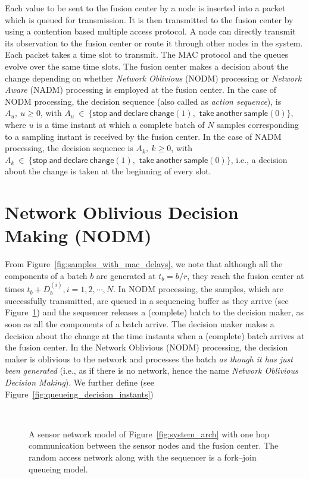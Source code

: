 \documentclass[acmtosn]{acmtrans2m}
\begin{document}
Each value to be sent to the fusion center by a node is inserted into a packet
which is queued for transmission. It is then transmitted to the fusion center 
by using a contention based multiple access protocol. A node can directly 
transmit its observation to the fusion center or route it through other nodes 
in the system. Each packet takes a time slot to transmit.  The MAC protocol and the queues 
evolve over the same time slots. The fusion center makes a decision about
the change depending on whether {\em Network Oblivious} ({\sf NODM}) processing 
or {\em Network Aware} ({\sf NADM}) processing is employed at the fusion center. 
In the case of {\sf NODM} processing, the decision sequence (also called as 
{\em action sequence}), is $A_u, \ u\geqslant 0$, with  
$A_u~\in~\{\mathsf{stop~and~declare~change}(1),$ $\mathsf{take~another~sample}(0)\}$,
where $u$ is a time instant at which a complete batch of $N$ samples corresponding 
to a sampling instant is received by the fusion center. In the case of {\sf NADM} 
processing, the decision sequence is $A_k, \ k\geqslant 0$, with  
$A_k~\in~\{\mathsf{stop~and~declare~change}(1),$ $\mathsf{take~another~sample}(0)\}$,
i.e., a decision about the change is taken at the beginning of every slot. 


\section{Network Oblivious Decision Making ({\sf NODM})}
\label{sec:no}
From Figure~\ref{fig:samples_with_mac_delays}, we note that
although all the components of a batch $b$ are generated at 
$t_b = b/r$, they reach the fusion center at times 
$t_b + D_b^{(i)}, i=1,2,\cdots,N$. In {\sf NODM} processing, 
the samples, which are successfully transmitted, are queued 
in a sequencing buffer as they arrive 
(see Figure~\ref{fig:parallel_arch}) and the sequencer releases 
a (complete) batch to the decision maker, as soon as all the 
components of a batch arrive. The decision maker 
makes a decision about the change at the time instants when a 
(complete) batch arrives at the fusion center. In the 
Network Oblivious ({\sf NODM}) processing, the decision maker 
is oblivious to the network and processes the 
batch {\em as though it has just been generated} 
(i.e., as if there is no network, hence the name {\em Network Oblivious Decision Making}). 
We further define (see Figure~\ref{fig:queueing_decision_instants})

 \begin{figure}[t]
   \centering \
   \caption{A sensor network model of Figure~\ref{fig:system_arch} with
   one hop communication between the sensor nodes and the fusion center.
   The random access network along with the sequencer is a fork--join
   queueing model.}
   \label{fig:parallel_arch}
 \end{figure}
\vspace{5mm}
\end{document}
